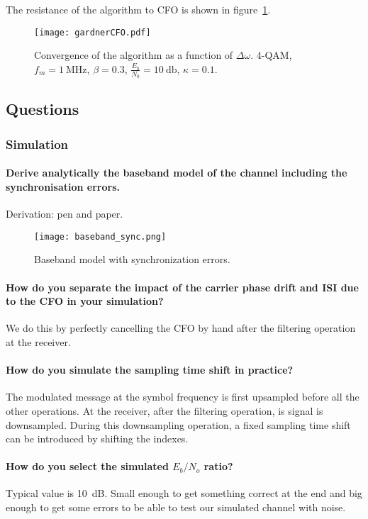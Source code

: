 The resistance of the algorithm to CFO is shown in figure~\ref{fig:gConvCFO}.
\begin{figure}[htbp]
    \centering
    \texttt{[image: gardnerCFO.pdf]}
    \caption{Convergence of the algorithm as a function of $\Delta\omega$. 4-QAM, $f_m = \SI{1}{\mega\hertz}$, $\beta = 0.3$, $\frac{E_b}{N_0} = \SI{10}{\decibel}$, $\kappa = 0.1$.\label{fig:gConvCFO}}
\end{figure}

\subsection{Questions}
\subsubsection{Simulation}

\paragraph{Derive analytically the baseband model of the channel including the synchronisation errors.}
Derivation: pen and paper.
\begin{figure}[htbp]
\texttt{[image: baseband\_sync.png]}
\caption{Baseband model with synchronization errors.\label{fig:sync}}
\end{figure}


\paragraph{How do you separate the impact of the carrier phase drift and ISI due to the CFO in your simulation?}
We do this by perfectly cancelling the CFO by hand after the filtering operation at the receiver.

\paragraph{How do you simulate the sampling time shift in practice?}The modulated message at the symbol frequency is first upsampled before all the other operations.
At the receiver, after the filtering operation, is signal is downsampled.
During this downsampling operation, a fixed sampling time shift can be introduced by shifting the indexes.

\paragraph{How do you select the simulated $E_{b}/N_{o}$ ratio?} Typical value is \SI{10}{\deci\bel}. Small enough to get something correct at the end and big enough to get some errors to be able to test our simulated channel with noise.

